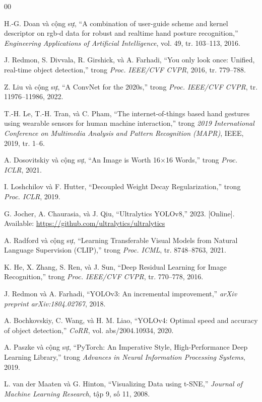 \documentclass[conference]{IEEEtran}
\begin{document}
\begin{thebibliography}{00}

 H.-G. Doan và cộng sự, ``A combination of user-guide scheme and kernel descriptor on rgb-d data for robust and realtime hand posture recognition,'' \textit{Engineering Applications of Artificial Intelligence}, vol. 49, tr. 103--113, 2016.

 J. Redmon, S. Divvala, R. Girshick, và A. Farhadi, ``You only look once: Unified, real-time object detection,'' trong \textit{Proc. IEEE/CVF CVPR}, 2016, tr. 779--788.

 Z. Liu và cộng sự, ``A ConvNet for the 2020s,'' trong \textit{Proc. IEEE/CVF CVPR}, tr. 11976--11986, 2022.

 T.-H. Le, T.-H. Tran, và C. Pham, ``The internet-of-things based hand gestures using wearable sensors for human machine interaction,'' trong \textit{2019 International Conference on Multimedia Analysis and Pattern Recognition (MAPR)}, IEEE, 2019, tr. 1--6.

 A. Dosovitskiy và cộng sự, ``An Image is Worth 16$\times$16 Words,'' trong \textit{Proc. ICLR}, 2021.

 I. Loshchilov và F. Hutter, ``Decoupled Weight Decay Regularization,'' trong \textit{Proc. ICLR}, 2019.

 G. Jocher, A. Chaurasia, và J. Qiu, ``Ultralytics YOLOv8,'' 2023. [Online]. Available: \url{https://github.com/ultralytics/ultralytics}

 A. Radford và cộng sự, ``Learning Transferable Visual Models from Natural Language Supervision (CLIP),'' trong \textit{Proc. ICML}, tr. 8748--8763, 2021.

 K. He, X. Zhang, S. Ren, và J. Sun, ``Deep Residual Learning for Image Recognition,'' trong \textit{Proc. IEEE/CVF CVPR}, tr. 770--778, 2016.

 J. Redmon và A. Farhadi, ``YOLOv3: An incremental improvement,'' \textit{arXiv preprint arXiv:1804.02767}, 2018.

 A. Bochkovskiy, C. Wang, và H. M. Liao, ``YOLOv4: Optimal speed and accuracy of object detection,'' \textit{CoRR}, vol. abs/2004.10934, 2020.

 A. Paszke và cộng sự, ``PyTorch: An Imperative Style, High-Performance Deep Learning Library,'' trong \textit{Advances in Neural Information Processing Systems}, 2019.

 L. van der Maaten và G. Hinton, ``Visualizing Data using t-SNE,'' \textit{Journal of Machine Learning Research}, tập 9, số 11, 2008.

\end{thebibliography}
\end{document}

